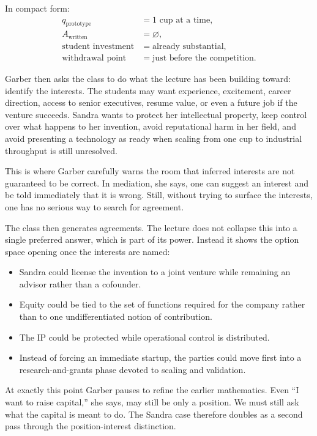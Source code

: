 In compact form:
\begin{align}
q_{\text{prototype}} &= 1 \text{ cup at a time},\\
A_{\text{written}} &= \varnothing,\\
\text{student investment} &= \text{already substantial},\\
\text{withdrawal point} &= \text{just before the competition}.
\end{align}

Garber then asks the class to do what the lecture has been building toward: identify the interests. The students may want experience, excitement, career direction, access to senior executives, resume value, or even a future job if the venture succeeds. Sandra wants to protect her intellectual property, keep control over what happens to her invention, avoid reputational harm in her field, and avoid presenting a technology as ready when scaling from one cup to industrial throughput is still unresolved.

This is where Garber carefully warns the room that inferred interests are not guaranteed to be correct. In mediation, she says, one can suggest an interest and be told immediately that it is wrong. Still, without trying to surface the interests, one has no serious way to search for agreement.

The class then generates agreements. The lecture does not collapse this into a single preferred answer, which is part of its power. Instead it shows the option space opening once the interests are named:
\begin{itemize}
\item Sandra could license the invention to a joint venture while remaining an advisor rather than a cofounder.
\item Equity could be tied to the set of functions required for the company rather than to one undifferentiated notion of contribution.
\item The IP could be protected while operational control is distributed.
\item Instead of forcing an immediate startup, the parties could move first into a research-and-grants phase devoted to scaling and validation.
\end{itemize}

At exactly this point Garber pauses to refine the earlier mathematics. Even ``I want to raise capital,'' she says, may still be only a position. We must still ask what the capital is meant to do. The Sandra case therefore doubles as a second pass through the position-interest distinction.

